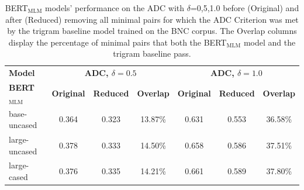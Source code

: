 
\begin{table}[h!]
    \centering
    \begin{tabular}{@{}lcccccc@{}}
    \toprule
    \textbf{Model} & \multicolumn{3}{c}{\textbf{ADC, $\delta=0.5$}} &  \multicolumn{3}{c}{\textbf{ADC, $\delta=1.0$}} \\
    \cmidrule{2-3} \cmidrule{4-7}
    \textbf{BERT}$_\mathrm{MLM}$ & \textbf{Original} & \textbf{Reduced} & \textbf{Overlap} & \textbf{Original} & \textbf{Reduced} & \textbf{Overlap} \\
    \midrule
    base-uncased & 0.364 & 0.323 & 13.87\% & 0.631 & 0.553 & 36.58\%\\
    large-uncased & 0.378 & 0.333 & 14.50\% & 0.658 & 0.586 & 37.51\%\\
    large-cased & 0.376 & 0.335 & 14.21\% &  0.661 & 0.589 & 37.80\% \\
    \bottomrule
    \end{tabular}
    \caption[BERT$_{\mathrm{MLM}}$ ADC with $\delta=$\{0.5,1.0\} scores\newline sans easy min pairs]{BERT$_{\mathrm{MLM}}$ models' performance on the ADC with $\delta$={0,5,1.0} before (Original) and after (Reduced) removing all minimal pairs for which the ADC Criterion was met by the trigram baseline model trained on the BNC corpus. The Overlap columns display the percentage of minimal pairs that both the BERT$_{\mathrm{MLM}}$ model and the trigram baseline pass.}
    \label{tab:table_20}
\end{table}

